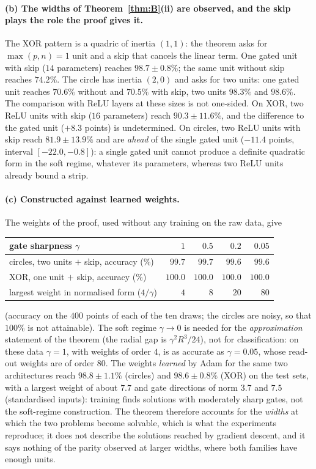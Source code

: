 \documentclass[11pt,a4paper]{article}
\theoremstyle{plain}
\theoremstyle{definition}
\theoremstyle{remark}
\begin{document}
\paragraph{(b) The widths of Theorem~\ref{thm:B}(ii) are observed, and the
skip plays the role the proof gives it.} The XOR pattern is a quadric of
inertia $(1,1)$: the theorem asks for $\max(p,n)=1$ unit and a skip that
cancels the linear term. One gated unit with skip ($14$ parameters) reaches
$98.7\pm0.8\%$; the same unit without skip reaches $74.2\%$. The circle
has inertia $(2,0)$ and asks for two units: one gated unit reaches
$70.6\%$ without and $70.5\%$ with skip, two units $98.3\%$ and $98.6\%$.
The comparison with ReLU layers at these sizes is not one-sided. On XOR,
two ReLU units with skip ($16$ parameters) reach $90.3\pm11.6\%$, and the
difference to the gated unit ($+8.3$ points) is undetermined. On circles,
two ReLU units with skip reach $81.9\pm13.9\%$ and are \emph{ahead} of the
single gated unit ($-11.4$ points, interval $[-22.0,-0.8]$): a single
gated unit cannot produce a definite quadratic form in the soft regime,
whatever its parameters, whereas two ReLU units already bound a strip.

\paragraph{(c) Constructed against learned weights.} The weights of the
proof, used without any training on the raw data, give
\begin{center}\small
\begin{tabular}{@{}lrrrr@{}}
\toprule
gate sharpness $\gamma$ & $1$ & $0.5$ & $0.2$ & $0.05$ \\
\midrule
circles, two units $+$ skip, accuracy (\%) & $99.7$ & $99.7$ & $99.6$ & $99.6$ \\
XOR, one unit $+$ skip, accuracy (\%) & $100.0$ & $100.0$ & $100.0$ & $100.0$ \\
largest weight in normalised form ($4/\gamma$) & $4$ & $8$ & $20$ & $80$ \\
\bottomrule
\end{tabular}
\end{center}
(accuracy on the $400$ points of each of the ten draws; the circles are
noisy, so that $100\%$ is not attainable). The soft regime
$\gamma\to0$ is needed for the \emph{approximation} statement of the
theorem (the radial gap is $\gamma^2R^3/24$), not for classification: on
these data $\gamma=1$, with weights of order $4$, is as accurate as
$\gamma=0.05$, whose read-out weights are of order $80$. The weights
\emph{learned} by Adam for the same two architectures reach $98.8\pm1.1\%$
(circles) and $98.6\pm0.8\%$ (XOR) on the test sets, with a largest weight
of about $7.7$ and gate directions of norm $3.7$ and $7.5$ (standardised
inputs): training finds solutions with moderately sharp gates, not the
soft-regime construction. The theorem therefore accounts for the
\emph{widths} at which the two problems become solvable, which is what the
experiments reproduce; it does not describe the solutions reached by
gradient descent, and it says nothing of the parity observed at larger
widths, where both families have enough units.
\end{document}
